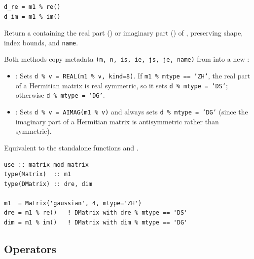 \lstset{language=[95]Fortran}
\begin{lstlisting}
d_re = m1 % re()
d_im = m1 % im()
\end{lstlisting}

Return a  containing the real part () or imaginary part () of , preserving shape, index bounds, and \texttt{name}.

Both methods copy metadata \texttt{(m, n, is, ie, js, je, name)} from  into a new  :
\begin{itemize}
  \item {}: Sets \texttt{d \% v = REAL(m1 \% v, kind=8)}. If \texttt{m1 \% mtype == 'ZH'}, the real part of a Hermitian matrix is real symmetric, so it sets \texttt{d \% mtype = 'DS'}; otherwise \texttt{d \% mtype = 'DG'}.
  \item {}: Sets \texttt{d \% v = AIMAG(m1 \% v)} and always sets \texttt{d \% mtype = 'DG'} (since the imaginary part of a Hermitian matrix is antisymmetric rather than symmetric).
\end{itemize}
Equivalent to the standalone functions  and .

\begin{description}[leftmargin=2.2cm, style=nextline]
\end{description}

\lstset{language=[95]Fortran}
\begin{lstlisting}
use :: matrix_mod_matrix
type(Matrix)  :: m1
type(DMatrix) :: dre, dim

m1  = Matrix('gaussian', 4, mtype='ZH')
dre = m1 % re()   ! DMatrix with dre % mtype == 'DS'
dim = m1 % im()   ! DMatrix with dim % mtype == 'DG'
\end{lstlisting}

\subsection{Operators}
\label{subsec:mat_operators}

